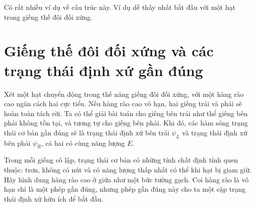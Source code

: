 Có rất nhiều ví dụ về cấu trúc này. Ví dụ dễ thấy nhất bắt đầu với một hạt trong giếng thế đôi đối xứng.

\section{Giếng thế đôi đối xứng và các trạng thái định xứ gần đúng}

Xét một hạt chuyển động trong thế năng giếng đôi đối xứng, với một hàng rào cao ngăn cách hai cực tiểu. Nếu hàng rào cao vô hạn, hai giếng trái và phải sẽ hoàn toàn tách rời. Ta có thể giải bài toán cho giếng bên trái như thể giếng bên phải không tồn tại, và tương tự cho giếng bên phải. Khi đó, các hàm sóng trạng thái cơ bản gần đúng sẽ là trạng thái định xứ bên trái \(\psi_L\) và trạng thái định xứ bên phải \(\psi_R\), cả hai có cùng năng lượng \(E\).

Trong mỗi giếng cô lập, trạng thái cơ bản có những tính chất định tính quen thuộc: trơn, không có nút và có năng lượng thấp nhất có thể khi hạt bị giam giữ. Hãy hình dung hàng rào cao ở giữa như một bức tường gạch. Coi hàng rào là vô hạn chỉ là một phép gần đúng, nhưng phép gần đúng này cho ta một cặp trạng thái định xứ hữu ích để bắt đầu.

